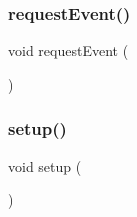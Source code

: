 \subsubsection{\texorpdfstring{request\+Event()}{requestEvent()}}
{\footnotesize\ttfamily void request\+Event (\begin{DoxyParamCaption}{ }\end{DoxyParamCaption})}

\mbox{\label{slave__sender_8ino_a4fc01d736fe50cf5b977f755b675f11d}} 
\subsubsection{\texorpdfstring{setup()}{setup()}}
{\footnotesize\ttfamily void setup (\begin{DoxyParamCaption}{ }\end{DoxyParamCaption})}

